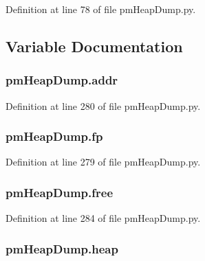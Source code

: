 Definition at line 78 of file pm\-Heap\-Dump.\-py.



\subsection{Variable Documentation}
\hypertarget{namespacepm_heap_dump_a18abce4c123c5eaa0e33bce572b198b2}{
\subsubsection[{addr}]{\setlength{\rightskip}{0pt plus 5cm}pm\-Heap\-Dump.\-addr}}\label{namespacepm_heap_dump_a18abce4c123c5eaa0e33bce572b198b2}


Definition at line 280 of file pm\-Heap\-Dump.\-py.

\hypertarget{namespacepm_heap_dump_ab477e371d9c3ece133b48c71871ad8f3}{
\subsubsection[{fp}]{\setlength{\rightskip}{0pt plus 5cm}pm\-Heap\-Dump.\-fp}}\label{namespacepm_heap_dump_ab477e371d9c3ece133b48c71871ad8f3}


Definition at line 279 of file pm\-Heap\-Dump.\-py.

\hypertarget{namespacepm_heap_dump_a8eb42273482f3108f8277cde5d915452}{
\subsubsection[{free}]{\setlength{\rightskip}{0pt plus 5cm}pm\-Heap\-Dump.\-free}}\label{namespacepm_heap_dump_a8eb42273482f3108f8277cde5d915452}


Definition at line 284 of file pm\-Heap\-Dump.\-py.

\hypertarget{namespacepm_heap_dump_afb77168fd59f79c92bbe0ea31f8aa949}{
\subsubsection[{heap}]{\setlength{\rightskip}{0pt plus 5cm}pm\-Heap\-Dump.\-heap}}\label{namespacepm_heap_dump_afb77168fd59f79c92bbe0ea31f8aa949}


